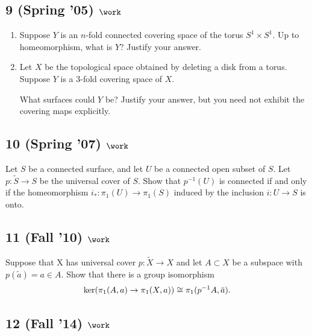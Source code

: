 \hypertarget{spring-05-work}{%
\subsection{\texorpdfstring{9 (Spring '05)
\(\work\)}{9 (Spring '05) \textbackslash work}}\label{spring-05-work}}

\begin{enumerate}
\def\labelenumi{\alph{enumi}.}
\item
  Suppose \(Y\) is an \(n\)-fold connected covering space of the torus
  \(S^1 \times S^1\). Up to homeomorphism, what is \(Y\)? Justify your
  answer.
\item
  Let \(X\) be the topological space obtained by deleting a disk from a
  torus. Suppose \(Y\) is a 3-fold covering space of \(X\).

  What surfaces could \(Y\) be? Justify your answer, but you need not
  exhibit the covering maps explicitly.
\end{enumerate}

\hypertarget{spring-07-work}{%
\subsection{\texorpdfstring{10 (Spring '07)
\(\work\)}{10 (Spring '07) \textbackslash work}}\label{spring-07-work}}

Let \(S\) be a connected surface, and let \(U\) be a connected open
subset of \(S\). Let \(p : \tilde S \to S\) be the universal cover of
\(S\). Show that \(p^{-1}(U )\) is connected if and only if the
homeomorphism \(i_\ast : \pi_1 (U ) \to \pi_1 (S)\) induced by the
inclusion \(i : U \to S\) is onto.

\hypertarget{fall-10-work}{%
\subsection{\texorpdfstring{11 (Fall '10)
\(\work\)}{11 (Fall '10) \textbackslash work}}\label{fall-10-work}}

Suppose that X has universal cover \(p : \tilde X \to X\) and let
\(A \subset X\) be a subspace with \(p(\tilde a) = a \in A\). Show that
there is a group isomorphism
\begin{align*}
\ker(\pi_1 (A, a) \to \pi_1 (X, a)) \cong \pi_1 (p^{-1}A, \mkern 1.5mu\overline{\mkern-1.5mua\mkern-1.5mu}\mkern 1.5mu)
.\end{align*}

\hypertarget{fall-14-work-2}{%
\subsection{\texorpdfstring{12 (Fall '14)
\(\work\)}{12 (Fall '14) \textbackslash work}}\label{fall-14-work-2}}

